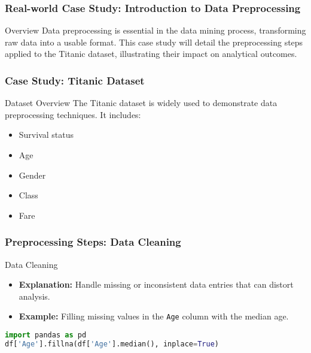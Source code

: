 \documentclass[aspectratio=169]{beamer}
\begin{document}
\begin{frame}
    \frametitle{Real-world Case Study: Introduction to Data Preprocessing}
    \begin{block}{Overview}
        Data preprocessing is essential in the data mining process, transforming raw data into a usable format.
        This case study will detail the preprocessing steps applied to the Titanic dataset, illustrating their impact on analytical outcomes.
    \end{block}
\end{frame}

\begin{frame}
    \frametitle{Case Study: Titanic Dataset}
    \begin{block}{Dataset Overview}
        The Titanic dataset is widely used to demonstrate data preprocessing techniques. It includes:
    \end{block}
    \begin{itemize}
        \item Survival status
        \item Age
        \item Gender
        \item Class
        \item Fare
    \end{itemize}
\end{frame}

\begin{frame}[fragile]
    \frametitle{Preprocessing Steps: Data Cleaning}
    \begin{block}{Data Cleaning}
        \begin{itemize}
            \item \textbf{Explanation:} Handle missing or inconsistent data entries that can distort analysis.
            \item \textbf{Example:} Filling missing values in the \texttt{Age} column with the median age.
        \end{itemize}
        \begin{lstlisting}[language=Python]
import pandas as pd
df['Age'].fillna(df['Age'].median(), inplace=True)
        \end{lstlisting}
    \end{block}
\end{frame}
\end{document}
